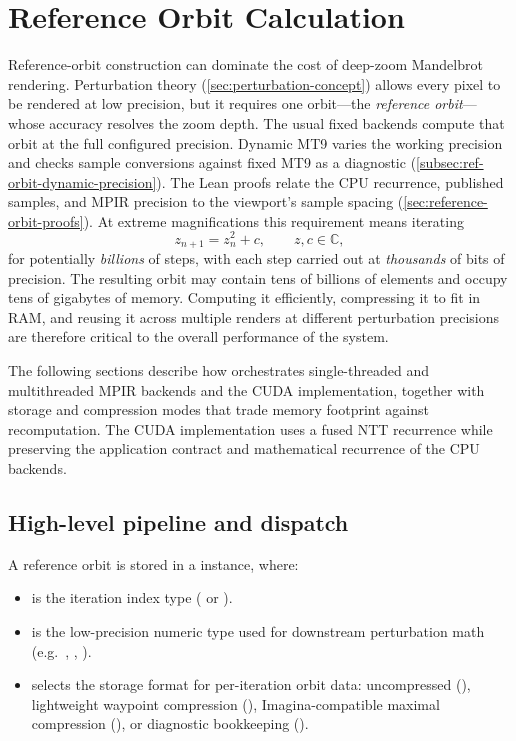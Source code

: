 \section{Reference Orbit Calculation}
\label{sec:ref-orbit-calc}

Reference-orbit construction can dominate the cost of
deep-zoom Mandelbrot rendering.  Perturbation theory
(\cref{sec:perturbation-concept}) allows every pixel to be rendered at
low precision, but it requires one orbit---the \emph{reference
orbit}---whose accuracy resolves the zoom depth. The usual fixed backends
compute that orbit at the full configured precision. Dynamic MT9 varies
the working precision and checks sample conversions against fixed MT9
as a diagnostic (\cref{subsec:ref-orbit-dynamic-precision}). The Lean
proofs relate the CPU recurrence, published samples, and MPIR precision
to the viewport's sample spacing (\cref{sec:reference-orbit-proofs}). At
extreme magnifications this requirement means iterating
\begin{equation}
  z_{n+1} = z_n^2 + c,\qquad z,c\in\mathbb{C},
  \label{eq:mandelbrot-recurrence}
\end{equation}
for potentially \emph{billions} of steps, with each step carried out at
\emph{thousands} of bits of precision.  The resulting orbit may contain
tens of billions of elements and occupy tens of gigabytes of memory.
Computing it efficiently, compressing it to fit in RAM, and reusing it
across multiple renders at different perturbation precisions are
therefore critical to the overall performance of the system.

The following sections describe how  orchestrates single-threaded and
multithreaded MPIR backends and the CUDA implementation,
together with storage and compression modes that trade memory footprint against
recomputation.  The CUDA implementation uses a fused NTT recurrence while
preserving the application contract and mathematical recurrence of the CPU
backends.

\subsection{High-level pipeline and dispatch}
\label{subsec:ref-orbit-pipeline}

A reference orbit is stored in a 
instance, where:

\begin{itemize}
  \item {} is the iteration index type ( or ).
  \item {} is the low-precision numeric type used for downstream perturbation math (e.g.\ ,
        , ).
  \item {} selects the storage format for per-iteration orbit data:
        uncompressed (), lightweight waypoint compression
        (), Imagina-compatible maximal compression
        (), or diagnostic bookkeeping ().
\end{itemize}


